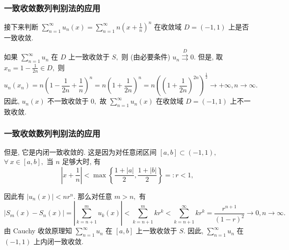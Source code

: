 
\begin{frame}
\frametitle{一致收敛数列判别法的应用}

接下来判断 $\sum_{n=1}^\infty u_n(x) = \sum_{n=1}^\infty n \left( x + \frac{1}{n} \right)^n$ 在收敛域 $D = (-1, 1)$ 上是否一致收敛.

\pause
\vspace{1em}

如果 $\sum_{n=1}^\infty u_n$ 在 $D$ 上一致收敛于 $S,$ 则 (由必要条件) $u_n \stackrel{D}{\rightrightarrows} 0.$ 但是, 取 $x_n = 1-\frac{1}{2n} \in D,$ 则
\[
u_n(x_n) = n \left( 1 - \frac{1}{2n} + \frac{1}{n} \right)^n = n \left( 1 + \frac{1}{2n} \right)^n = n \left( \left( 1 + \frac{1}{2n} \right)^{2n} \right)^{\frac{1}{2}} \to +\infty, n \to \infty.
\]
因此, $u_n(x)$ 不一致收敛于 $0,$ 故 $\sum_{n=1}^\infty u_n(x)$ 在收敛域 $D = (-1, 1)$ 上不一致收敛.

\end{frame}


\begin{frame}
\frametitle{一致收敛数列判别法的应用}

但是, 它是内闭一致收敛的. 这是因为对任意闭区间 $[a, b] \subset (-1, 1),$ $\forall ~ x \in [a, b],$ 当 $n$ 足够大时, 有
\[
\left| x + \frac{1}{n} \right| < \max \left\{ \frac{1+|a|}{2}, \frac{1+|b|}{2} \right\} =: r < 1,
\]
\begin{center}
\end{center}
因此有 $|u_n(x)| < n r^n.$ 那么对任意 $m > n,$ 有
\[
|S_m(x) - S_n(x)| = \left| \sum_{k=n+1}^m u_k(x) \right| < \sum_{k=n+1}^m k r^k < \sum_{k=n+1}^\infty k r^k = \frac{r^{n+1}}{(1-r)^2} \to 0, n \to \infty.
\]
由 Cauchy 收敛原理知 $\sum_{n=1}^\infty u_n$ 在 $[a, b]$ 上一致收敛于 $S.$ 因此, $\sum_{n=1}^\infty u_n$ 在 $(-1, 1)$ 上内闭一致收敛.

\end{frame}


